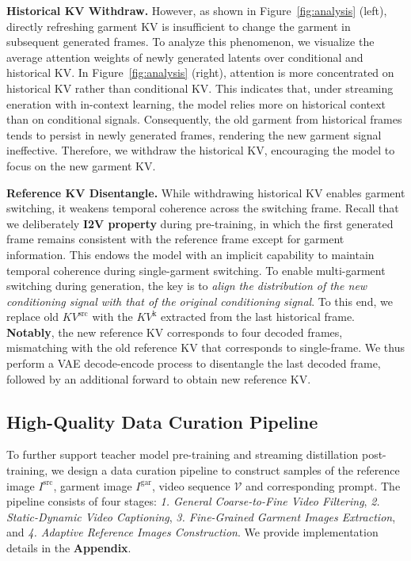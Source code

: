 \documentclass{llmxive}
\begin{document}
\noindent
\textbf{Historical KV Withdraw.}
% 
However, as shown in Figure~\ref{fig:analysis} (left), directly refreshing garment KV is insufficient to change the garment in subsequent generated frames.
%
To analyze this phenomenon, we visualize the average attention weights of newly generated latents over conditional and historical KV. In Figure~\ref{fig:analysis} (right), attention is more concentrated on historical KV rather than conditional KV.
This indicates that, under streaming eneration with in-context learning, the model relies more on historical context than on conditional signals.
Consequently, the old garment from historical frames tends to persist in newly generated frames, rendering the new garment signal ineffective.
%
Therefore, we withdraw the historical KV, encouraging the model to focus on the new garment KV.



\noindent
\textbf{Reference KV Disentangle.}
%
While withdrawing historical KV enables garment switching, it weakens temporal coherence across the switching frame.
% 
Recall that we deliberately \textbf{I2V property} during pre-training, in which the first generated frame remains consistent with the reference frame except for garment information. This endows the model with an implicit capability to maintain temporal coherence during single-garment switching.
% 
To enable multi-garment switching during generation, the key is to \textit{align the distribution of the new conditioning signal with that of the original conditioning signal}.
% 
To this end, we replace old $KV^{\text{src}}$ with the $KV^{\text{k}}$ extracted from the last historical frame.
% 
\textbf{Notably}, the new reference KV corresponds to four decoded frames, mismatching with the old reference KV that corresponds to single-frame.
We thus perform a VAE decode-encode process to disentangle the last decoded frame, followed by an additional forward to obtain new reference KV.





\subsection{High-Quality Data Curation Pipeline}
\label{sec:3-4}
%
To further support teacher model pre-training and streaming distillation post-training, we design a data curation pipeline to construct samples of the reference image $I^{\text{src}}$, garment image $I^{\text{gar}}$, video sequence $\mathcal{V}$ and corresponding prompt.
The pipeline consists of four stages: \textit{1. General Coarse-to-Fine Video Filtering}, \textit{2. Static-Dynamic Video Captioning}, \textit{3. Fine-Grained Garment Images Extraction}, and \textit{4. Adaptive Reference Images Construction}.
We provide implementation details in the \textbf{Appendix}.
\end{document}
